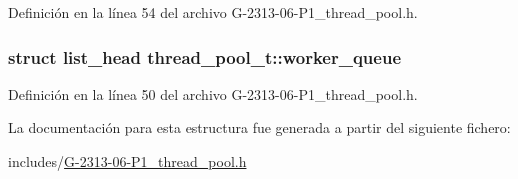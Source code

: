 Definición en la línea 54 del archivo G-\/2313-\/06-\/\+P1\+\_\+thread\+\_\+pool.\+h.

\subsubsection[{\texorpdfstring{worker\+\_\+queue}{worker_queue}}]{\setlength{\rightskip}{0pt plus 5cm}struct {\bf list\+\_\+head} thread\+\_\+pool\+\_\+t\+::worker\+\_\+queue}\hypertarget{structthread__pool__t_a44640e57780a54d437d7589b1c754ac1}{}\label{structthread__pool__t_a44640e57780a54d437d7589b1c754ac1}


Definición en la línea 50 del archivo G-\/2313-\/06-\/\+P1\+\_\+thread\+\_\+pool.\+h.



La documentación para esta estructura fue generada a partir del siguiente fichero\+:\begin{DoxyCompactItemize}
\item 
includes/\hyperlink{G-2313-06-P1__thread__pool_8h}{G-\/2313-\/06-\/\+P1\+\_\+thread\+\_\+pool.\+h}\end{DoxyCompactItemize}
